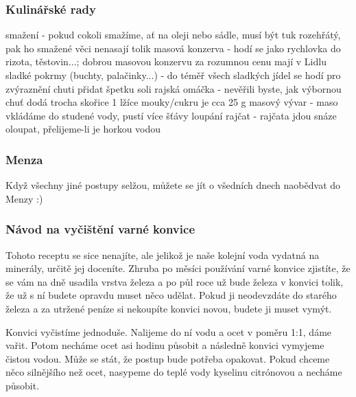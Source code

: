 \subsubsection{Kulinářské rady}
smažení - pokud cokoli smažíme, ať na oleji nebo sádle, musí být tuk rozehřátý, pak ho smažené věci nenasají tolik
masová konzerva - hodí se jako rychlovka do rizota, těstovin...; dobrou masovou konzervu za rozumnou cenu mají v Lidlu
sladké pokrmy (buchty, palačinky...) - do téměř všech sladkých jídel se hodí pro zvýraznění chuti přidat špetku soli
rajská omáčka - nevěřili byste, jak výbornou chuť dodá trocha skořice
1 lžíce mouky/cukru je cca 25 g
masový vývar - maso vkládáme do studené vody, pustí více šťávy
loupání rajčat - rajčata jdou snáze oloupat, přelijeme-li je horkou vodou

\subsubsection{Menza}
Když všechny jiné postupy selžou, můžete se jít o všedních dnech naobědvat do Menzy :)

\subsubsection{Návod na vyčištění varné konvice}
Tohoto receptu se sice nenajíte, ale jelikož je naše kolejní voda vydatná na minerály, určitě jej doceníte. Zhruba po měsíci používání varné konvice zjistíte, že se vám na dně usadila vrstva železa a po půl roce už bude železa v konvici tolik, že už s ní budete opravdu muset něco udělat. Pokud ji neodevzdáte do starého železa a za utržené peníze si nekoupíte konvici novou, budete ji muset vymýt.

Konvici vyčistíme jednoduše. Nalijeme do ní vodu a ocet v poměru 1:1, dáme vařit. Potom necháme ocet asi hodinu působit a následně konvici vymyjeme čistou vodou. Může se stát, že postup bude potřeba opakovat. Pokud chceme něco silnějšího než ocet, nasypeme do teplé vody kyselinu citrónovou a necháme působit.